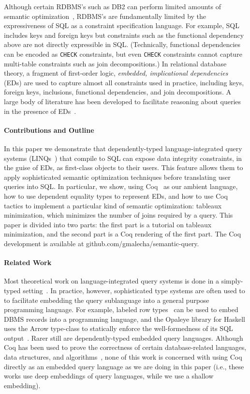 \documentclass[preprint]{sigplanconf}
\begin{document}
Although certain RDBMS's such as DB2 can perform limited amounts of semantic optimization~\cite{Cheng:1999:ITS:645925.671357}, RDBMS's are fundamentally limited by the expressiveness of SQL as a constraint specification language.
For example, SQL includes keys and foreign keys but constraints such as the functional dependency above are not directly expressible in SQL. (Technically, functional dependencies can be encoded as {\tt CHECK} constraints, but even {\tt CHECK} constraints cannot capture multi-table constraints such as join decompositions.)
In relational database theory, a fragment of first-order logic, {\it embedded, implicational dependencies} (EDs) are used to capture almost all constraints used in practice, including keys, foreign keys, inclusions, functional dependencies, and join decompositions.
A large body of literature has been developed to facilitate reasoning about queries in the presence of EDs~\cite{Popa99anequational}. 

\paragraph{Contributions and Outline} In this paper we demonstrate that dependently-typed language-integrated query systems (LINQs~\cite{monad}) that compile to SQL can expose data integrity constraints, in the guise of EDs, as first-class objects to their users. This feature allows them to apply sophisticated semantic optimization techniques before translating user queries into SQL.  In particular, we show, using Coq~\cite{coq:coq} as our ambient language, how to use dependent equality types to represent EDs, and how to use Coq tactics to implement a particular kind of semantic optimization: tableaux minimization, which minimizes the number of joins required by a query.  This paper is divided into two parts: the first part is a tutorial on tableaux minimization, and the second part is a Coq rendering of the first part. The Coq development is available at {\sf github.com/gmalecha/semantic-query}.

\paragraph{Related Work} Most theoretical work on language-integrated query systems is done in a simply-typed setting~\cite{tannen:1992:NEQ:645500.655920}.  In practice, however, sophisticated type systems are often used to to facilitate embedding the query sublanguage into a general purpose programming language.  For example, labeled row types~\cite{mpj:jones1996a} can be used to embed DBMS records into a programming language, and the Opaleye library for Haskell uses the Arrow type-class to statically enforce the well-formedness of its SQL output~\cite{opaleye}.  Rarer still are dependently-typed embedded query languages.
Although Coq has been used to prove the correctness of certain database-related languages, data structures, and algorithms~\cite{Malecha:2010:TVR:1706299.1706329,coqdb}, none of this work is concerned with using Coq directly as an embedded query language as we are doing in this paper (i.e., these works use deep embeddings of query languages, while we use a shallow embedding).  
\end{document}
